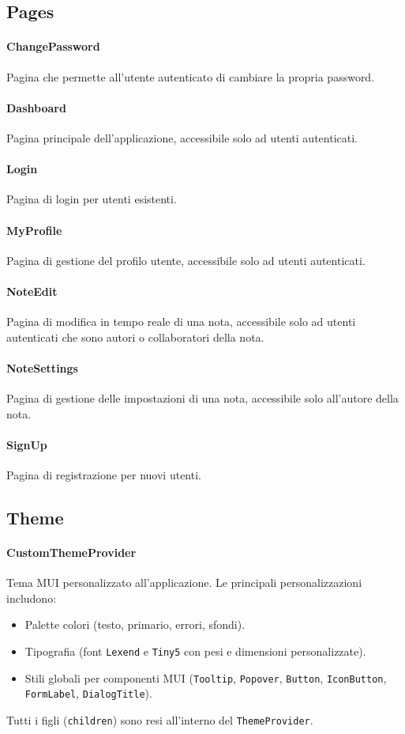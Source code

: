 \documentclass[11pt]{article}
\begin{document}
\subsection{Pages}
\paragraph{ChangePassword}  
Pagina che permette all’utente autenticato di cambiare la propria password.

\paragraph{Dashboard}  
Pagina principale dell’applicazione, accessibile solo ad utenti autenticati.

\paragraph{Login}  
Pagina di login per utenti esistenti.

\paragraph{MyProfile}  
Pagina di gestione del profilo utente, accessibile solo ad utenti autenticati.

\paragraph{NoteEdit}  
Pagina di modifica in tempo reale di una nota, accessibile solo ad utenti autenticati che sono autori o collaboratori della nota.

\paragraph{NoteSettings}
Pagina di gestione delle impostazioni di una nota, accessibile solo all’autore della nota.

\paragraph{SignUp}
Pagina di registrazione per nuovi utenti.

\subsection{Theme}
\paragraph{CustomThemeProvider}  
Tema MUI personalizzato all’applicazione.  
Le principali personalizzazioni includono:  
\begin{itemize}
  \item Palette colori (testo, primario, errori, sfondi).  
  \item Tipografia (font \texttt{Lexend} e \texttt{Tiny5} con pesi e dimensioni personalizzate).  
  \item Stili globali per componenti MUI (\texttt{Tooltip}, \texttt{Popover}, \texttt{Button}, \texttt{IconButton}, \texttt{FormLabel}, \texttt{DialogTitle}).  
\end{itemize}
Tutti i figli (\texttt{children}) sono resi all’interno del \texttt{ThemeProvider}.  
\end{document}
